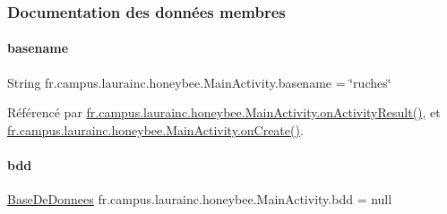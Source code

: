\subsubsection{Documentation des données membres}
\mbox{\label{classfr_1_1campus_1_1laurainc_1_1honeybee_1_1_main_activity_a14d932c5d8ba352ebd01cc984110adf3}} 
\paragraph{\texorpdfstring{basename}{basename}}
{\footnotesize\ttfamily String fr.\+campus.\+laurainc.\+honeybee.\+Main\+Activity.\+basename = \char`\"{}ruches\char`\"{}\hspace{0.3cm}{\ttfamily [private]}}



Référencé par \hyperlink{classfr_1_1campus_1_1laurainc_1_1honeybee_1_1_main_activity_ae751b46f1881bda6b3b0e08025a9c044}{fr.\+campus.\+laurainc.\+honeybee.\+Main\+Activity.\+on\+Activity\+Result()}, et \hyperlink{classfr_1_1campus_1_1laurainc_1_1honeybee_1_1_main_activity_aba2e570bbba3bf1be8487068d9c6c2da}{fr.\+campus.\+laurainc.\+honeybee.\+Main\+Activity.\+on\+Create()}.

\mbox{\label{classfr_1_1campus_1_1laurainc_1_1honeybee_1_1_main_activity_ae01aec19dc79f2c48d1807ccb2d3fa4a}} 
\paragraph{\texorpdfstring{bdd}{bdd}}
{\footnotesize\ttfamily \hyperlink{classfr_1_1campus_1_1laurainc_1_1honeybee_1_1_base_de_donnees}{Base\+De\+Donnees} fr.\+campus.\+laurainc.\+honeybee.\+Main\+Activity.\+bdd = null\hspace{0.3cm}{\ttfamily [private]}}

